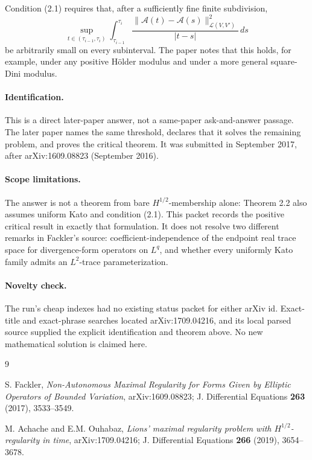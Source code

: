 \documentclass[10pt]{article}
\begin{document}
Condition (2.1) requires that, after a sufficiently fine finite subdivision,
\[
 \sup_{t\in(\tau_{i-1},\tau_i)}
 \int_{\tau_{i-1}}^{\tau_i}
 \frac{\|\mathcal A(t)-\mathcal A(s)\|_{\mathcal L(V,V')}^2}{|t-s|}\,ds
\]
be arbitrarily small on every subinterval.  The paper notes that this holds,
for example, under any positive H\"older modulus and under a more general
square-Dini modulus.

\paragraph{Identification.}
This is a direct later-paper answer, not a same-paper ask-and-answer passage.
The later paper names the same threshold, declares that it solves the
remaining problem, and proves the critical theorem.  It was submitted in
September 2017, after arXiv:1609.08823 (September 2016).

\paragraph{Scope limitations.}
The answer is not a theorem from bare $H^{1/2}$-membership alone: Theorem
2.2 also assumes uniform Kato and condition (2.1).  This packet records the
positive critical result in exactly that formulation.  It does not resolve
two different remarks in Fackler's source: coefficient-independence of the
endpoint real trace space for divergence-form operators on $L^q$, and
whether every uniformly Kato family admits an $L^2$-trace parameterization.

\paragraph{Novelty check.}
The run's cheap indexes had no existing status packet for either arXiv id.
Exact-title and exact-phrase searches located arXiv:1709.04216, and its local
parsed source supplied the explicit identification and theorem above.  No new
mathematical solution is claimed here.

\begin{thebibliography}{9}
\small
\raggedright

S. Fackler,
\emph{Non-Autonomous Maximal Regularity for Forms Given by Elliptic Operators
of Bounded Variation},
arXiv:1609.08823; J. Differential Equations \textbf{263} (2017), 3533--3549.

M. Achache and E.M. Ouhabaz,
\emph{Lions' maximal regularity problem with $H^{1/2}$-regularity in time},
arXiv:1709.04216; J. Differential Equations \textbf{266} (2019), 3654--3678.

\end{thebibliography}
\end{document}
